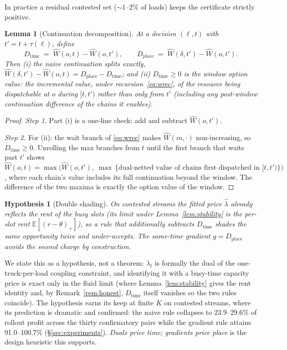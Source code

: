 \documentclass[11pt]{article}
\newtheorem{lemma}{Lemma}
\newtheorem{hypothesis}{Hypothesis}
\begin{document}
In practice a residual contested set (${\sim}1$--$2\%$ of loads) keeps
the certificate strictly positive.

\begin{lemma}[Continuation decomposition]
\label{lem:doublecount}
At a decision $(\ell, t)$ with $t' = t + \tau(\ell)$, define
\[
  D_{\mathrm{time}} \;=\; \widehat{W}(o, t) - \widehat{W}(o, t'),
  \qquad
  D_{\mathrm{place}} \;=\; \widehat{W}(\delta, t') - \widehat{W}(o, t').
\]
Then (i) the naive continuation splits exactly,
$\widehat{W}(\delta, t') - \widehat{W}(o, t)
= D_{\mathrm{place}} - D_{\mathrm{time}}$; and (ii)
$D_{\mathrm{time}} \geq 0$ is the \emph{window option value}: the
incremental value, under recursion~\eqref{eq:wrec}, of the resource
being dispatchable at $o$ during $[t, t')$ rather than only from $t'$
(including any post-window continuation difference of the chains it
enables).
\end{lemma}

\begin{proof}
\emph{Step 1.} Part (i) is a one-line check: add and subtract
$\widehat{W}(o, t')$.

\emph{Step 2.} For (ii): the wait branch of \eqref{eq:wrec} makes
$\widehat{W}(m, \cdot)$ non-increasing, so $D_{\mathrm{time}} \geq 0$.
Unrolling the max branches from $t$ until the first branch that waits
past $t'$ shows $\widehat{W}(o, t) = \max\bigl( \widehat{W}(o, t'),\;
\max\,\{\text{dual-netted value of chains first dispatched in }
[t, t')\} \bigr)$, where each chain's value includes its full
continuation beyond the window. The difference of the two maxima is
exactly the option value of the window.
\end{proof}

\begin{hypothesis}[Double shading]
\label{hyp:doubleshade}
On contested streams the fitted price $\hat{\lambda}$ already reflects
the rent of the busy slots (its limit under
Lemma~\ref{lem:stability} is the per-slot rent
$\mathbb{E}[(r - \theta)_+]$), so a rule that additionally subtracts
$D_{\mathrm{time}}$ shades the same opportunity twice and
under-accepts. The same-time gradient $g = D_{\mathrm{place}}$ avoids
the second charge by construction.
\end{hypothesis}

We state this as a hypothesis, not a theorem: $\lambda_t$ is formally
the dual of the one-truck-per-load coupling constraint, and
identifying it with a busy-time capacity price is exact only in the
fluid limit (where Lemma~\ref{lem:stability} gives the rent identity
and, by Remark~\ref{rem:honest}, $D_{\mathrm{time}}$ itself vanishes
so the two rules coincide). The hypothesis earns its keep at finite
$K$ on contested streams, where its prediction is dramatic and
confirmed: the naive rule collapses to 23.9--29.6\% of rollout
profit across the thirty confirmatory pairs while the gradient rule
attains 91.0--100.7\% (\S\ref{sec:experiments}). \emph{Duals price time; gradients price
place} is the design heuristic this supports.
\end{document}
